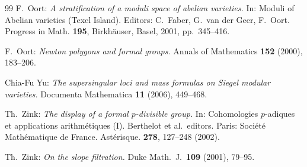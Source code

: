 \begin{thebibliography}{99}
 F.\ Oort:
{\sl A stratification of a moduli space
of abelian varieties.} In: Moduli of Abelian varieties (Texel Island).
Editors: C.\ Faber, G.\ van der Geer, F.\ Oort. Progress in Math.
\textbf{195}, Birkh\"auser, Basel, 2001, pp.\ 345--416.

 F.\ Oort: {\sl Newton polygons and formal groups.}
Annals of Mathematics \textbf{152} (2000), 183--206.

 Chia-Fu Yu:
{\sl The supersingular loci and mass formulas on Siegel modular varieties.}
Documenta Mathematica \textbf{11} (2006), 449--468.

Th.\ Zink:
{\sl The display of a formal $p$-divisible group.} In:
Cohomologies $p$-adiques et applications arithm\'etiques (I).
Berthelot et al.\ editors. Paris: Soci\'et\'e Math\'ematique de France. Ast\'erisque. {\bf 278}, 127--248 (2002).

 Th.\ Zink:
{\sl On the slope filtration.} Duke Math.\ J.\ \textbf{109} (2001), 79--95.


\end{thebibliography}
